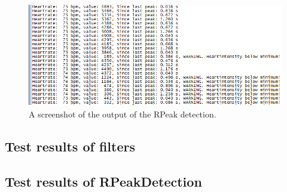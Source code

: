 \documentclass[12pt,a4paper]{article}
\begin{document}
	
	\begin{figure}[h!]
		\centering
			\includegraphics[width=1\textwidth]{Screenshots/RPeakDetection_result.png}
		\caption{A screenshot of the output of the RPeak detection.}
		\label{RPeakDetection_result}
	\end{figure}
\subsection{Test results of filters}

\begin{figure}[h!]
\end{figure}
\subsection{Test results of RPeakDetection}
\end{document}
